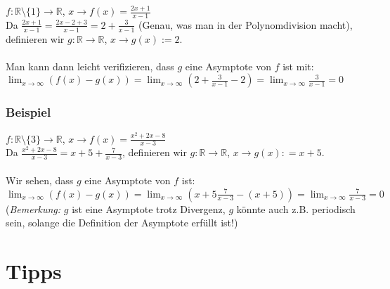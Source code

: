 \documentclass[11pt]{article} %
\begin{document}
$f: \mathbb{R} \setminus \{1\} \rightarrow \mathbb{R}$, $x \rightarrow f(x) = \frac{2x + 1}{x-1}$\\

Da $\frac{2x + 1}{x-1} = \frac{2x -2 + 3}{x-1} = 2+\frac{3}{x-1}$ (Genau, was man in der Polynomdivision macht), definieren wir $g: \mathbb{R}\rightarrow \mathbb{R}$,  $x \rightarrow g(x) := 2$. \\\\
Man kann dann leicht verifizieren, dass $g$ eine Asymptote von $f$ ist mit: $\lim_{x \rightarrow \infty} (f(x) - g(x)) = \lim_{x \rightarrow \infty} (2+ \frac{3}{x-1} - 2) = \lim_{x \rightarrow \infty} \frac{3}{x-1} = 0$

\subsubsection{Beispiel}
$f: \mathbb{R} \setminus \{3\} \rightarrow \mathbb{R}$, $x \rightarrow f(x) = \frac{x^2 + 2x -8}{x-3}$\\

Da $\frac{x^2 + 2x -8}{x-3}= x + 5 +\frac{7}{x-3}$, definieren wir $g: \mathbb{R}\rightarrow \mathbb{R}$,  $x \rightarrow g(x): = x+5$. \\\\
Wir sehen, dass $g$ eine Asymptote von $f$ ist: $\lim_{x \rightarrow \infty} (f(x) - g(x)) = \lim_{x \rightarrow \infty} (x+ 5\frac{7}{x-3} - (x+5)) = \lim_{x \rightarrow \infty} \frac{7}{x-3} = 0$ (\emph{Bemerkung:} $g$ ist eine Asymptote trotz Divergenz, $g$ könnte auch z.B. periodisch sein, solange die Definition der Asymptote erfüllt ist!)

\section{Tipps}
\end{document}
